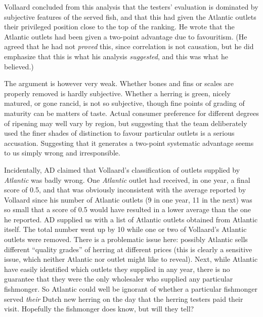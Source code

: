 \documentclass[alpha-refs]{wiley-article}
\begin{document}
Vollaard concluded from this analysis that the testers' evaluation is dominated by subjective features of the served fish, and that this had given the Atlantic outlets their privileged position close to the top of the ranking.  He wrote that the Atlantic outlets had been given a two-point advantage due to favouritism. (He agreed that he had not \emph{proved} this, since correlation is not causation, but he did emphasize that this is what his analysis \emph{suggested}, and this was what he believed.)  

The argument is however very weak.  Whether bones and fins or scales are properly removed is hardly subjective.  Whether a herring is green, nicely matured, or gone rancid, is not so subjective, though fine points of grading of maturity can be matters of taste. Actual consumer preference for different degrees of ripening may well vary by region, but suggesting that the team deliberately used the finer shades of distinction to favour particular outlets is a serious accusation. Suggesting that it generates a two-point systematic advantage seems to us simply wrong and irresponsible.

Incidentally, AD claimed that Vollaard's classification of outlets supplied by \emph{Atlantic} was badly wrong. One \emph{Atlantic} outlet had received, in one year, a final score of 0.5, and that was obviously inconsistent with the average reported by Vollaard since his number of Atlantic outlets (9 in one year, 11 in the next) was so small that a score of 0.5 would have resulted in a lower average than the one he reported. AD supplied us with a list of Atlantic outlets obtained from Atlantic itself. The total number went up by 10 while one or two of Vollaard's Atlantic outlets were removed. There is a problematic issue here: possibly Atlantic sells different ``quality grades'' of herring at different prices (this is clearly a sensitive issue, which neither Atlantic nor outlet might like to reveal). Next, while Atlantic have easily identified which outlets they supplied in any year, there is no guarantee that they were the only wholesaler who supplied any particular fishmonger. So Atlantic could well be ignorant of whether a particular fishmonger served \emph{their} Dutch new herring on the day that the herring testers paid their visit. Hopefully the fishmonger does know, but will they tell?
\end{document}
